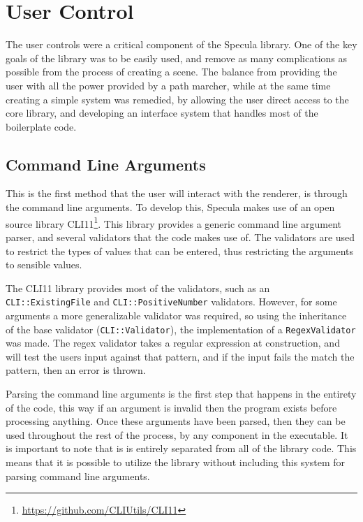 \documentclass[../pbr.tex]{subfile}
\begin{document}
\section{User Control}%
\label{sec:user_control}

The user controls were a critical component of the Specula library. One of the
key goals of the library was to be easily used, and remove as many complications
as possible from the process of creating a scene. The balance from providing
the user with all the power provided by a path marcher, while at the same time
creating a simple system was remedied, by allowing the user direct access to
the core library, and developing an interface system that handles most of the
boilerplate code.

\subsection{Command Line Arguments}%
\label{sub:command_line_arguments}

This is the first method that the user will interact with the renderer, is
through the command line arguments. To develop this, Specula makes use of an
open source library CLI11\footnote{\url{https://github.com/CLIUtils/CLI11}}.
This library provides a generic command line argument parser, and several
validators that the code makes use of. The validators are used to restrict the
types of values that can be entered, thus restricting the arguments to sensible
values.

The CLI11 library provides most of the validators, such as an
\texttt{CLI::ExistingFile} and \texttt{CLI::PositiveNumber}
validators. However, for some arguments a more generalizable validator was
required, so using the inheritance of the base validator
(\texttt{CLI::Validator}), the implementation of a
\texttt{RegexValidator} was made. The regex validator takes a regular
expression at construction, and will test the users input against that pattern,
and if the input fails the match the pattern, then an error is thrown.

Parsing the command line arguments is the first step that happens in the
entirety of the code, this way if an argument is invalid then the program
exists before processing anything. Once these arguments have been parsed, then
they can be used throughout the rest of the process, by any component in the
executable. It is important to note that is is entirely separated from all of
the library code. This means that it is possible to utilize the library without
including this system for parsing command line arguments.
\end{document}
